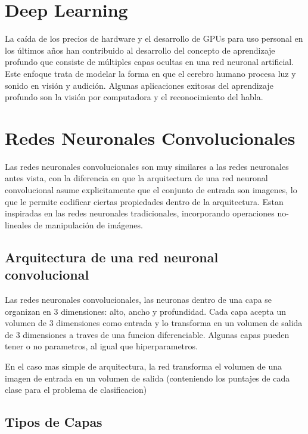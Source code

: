 \documentclass[a4paper,12pt,spanish]{book}
\begin{document}
  \section {Deep Learning}
    La caída de los precios de hardware y el desarrollo de GPUs para uso personal en los últimos años han contribuido al desarrollo del concepto de aprendizaje profundo que consiste
    de múltiples capas ocultas en una red neuronal artificial. Este enfoque trata de modelar la forma en que el cerebro humano procesa luz y sonido en visión y audición.
    Algunas aplicaciones exitosas del aprendizaje profundo son la visión por computadora y el reconocimiento del habla.

  \section {Redes Neuronales Convolucionales}
    Las redes neuronales convolucionales son muy similares a las redes neuronales antes vista, con la diferencia en que la arquitectura de una red neuronal convolucional asume explicitamente
    que el conjunto de entrada son imagenes, lo que le permite codificar ciertas propiedades dentro de la arquitectura. 
    Estan inspiradas en las redes neuronales tradicionales, incorporando operaciones no-lineales de manipulación de imágenes.

    \subsection {Arquitectura de una red neuronal convolucional}
      Las redes neuronales convolucionales, las neuronas dentro de una capa se organizan en 3 dimensiones: alto, ancho y profundidad.
      Cada capa acepta un volumen de 3 dimensiones como entrada y lo transforma en un volumen de salida de 3 dimensiones a traves de una funcion diferenciable.
      Algunas capas pueden tener o no parametros, al igual que hiperparametros.

      En el caso mas simple de arquitectura, la red transforma el volumen de una imagen de entrada en un volumen de salida (conteniendo los puntajes de cada clase para el problema de clasificacion)

    \subsection {Tipos de Capas}
\end{document}
